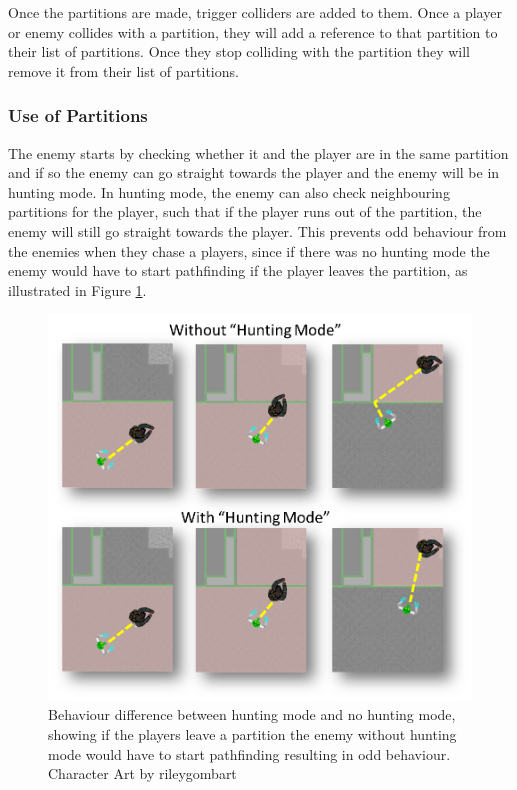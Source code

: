 Once the partitions are made, trigger colliders are added to them.
Once a player or enemy collides with a partition, they will add a reference to that partition to their list of partitions.
Once they stop colliding with the partition they will remove it from their list of partitions.

\subsubsection*{Use of Partitions}
The enemy starts by checking whether it and the player are in the same partition and if so the enemy can go straight towards the player and the enemy will be in hunting mode.
In hunting mode, the enemy can also check neighbouring partitions for the player, such that if the player runs out of the partition, the enemy will still go straight towards the player.
This prevents odd behaviour from the enemies when they chase a players, since if there was no hunting mode the enemy would have to start pathfinding if the player leaves the partition, as illustrated in Figure \ref{huntingMode}.

\begin{figure}[H]
\begin{center}
        \includegraphics[width=\textwidth]{figures/astar/huntingMode.png}
    \caption{Behaviour difference between hunting mode and no hunting mode, showing if the players leave a partition the enemy without hunting mode would have to start pathfinding resulting in odd behaviour. Character Art by rileygombart\cite{artist}}\label{huntingMode}
\end{center}
\end{figure}

